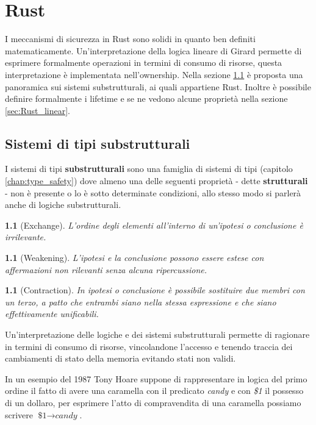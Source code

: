 \documentclass[Lau,binding=0.6cm]{sapthesis}
\newtheorem{lemma}[theorem]{}
\begin{document}
\chapter{Rust} \label{chap:Rust}

I meccanismi di sicurezza in Rust sono solidi in quanto ben definiti matematicamente.
Un'interpretazione della logica lineare di Girard permette di esprimere formalmente operazioni in termini di consumo di risorse, questa interpretazione è implementata nell'ownership.
Nella sezione \ref{sec:Rust_substruct} è proposta una panoramica sui sistemi substrutturali, ai quali appartiene Rust. 
Inoltre è possibile definire formalmente i lifetime e se ne vedono alcune proprietà nella sezione \ref{sec:Rust_linear}.

\section{Sistemi di tipi substrutturali} \label{sec:Rust_substruct}

I sistemi di tipi \textbf{substrutturali} sono una famiglia di sistemi di tipi (capitolo \ref{chap:type_safety}) dove almeno una delle seguenti proprietà - dette \textbf{strutturali} - non è presente o lo è sotto determinate condizioni, allo stesso modo si parlerà anche di logiche substrutturali.

\begin{lemma}[Exchange] \label{lemma:exchange}
    L'ordine degli elementi all'interno di un'ipotesi o conclusione è irrilevante.
\end{lemma}

\begin{lemma}[Weakening] \label{lemma:weakening}
    L'ipotesi e la conclusione possono essere estese con affermazioni non rilevanti senza alcuna ripercussione. 
\end{lemma}

\begin{lemma}[Contraction] \label{lemma:contraction}
    In ipotesi o conclusione è possibile sostituire due membri con un terzo, a patto che entrambi siano nella stessa espressione e che siano effettivamente unificabili.
\end{lemma}

Un'interpretazione delle logiche e dei sistemi substrutturali permette di ragionare in termini di consumo di risorse, vincolandone l'accesso e tenendo traccia dei cambiamenti di stato della memoria evitando stati non validi. 

In un esempio del 1987 Tony Hoare suppone di rappresentare in logica del primo ordine il fatto di avere una caramella con il predicato \textit{candy} e con  \textit{\$1} il possesso di un dollaro, per esprimere l'atto di compravendita di una caramella possiamo scrivere $ \textit{\$1} \rightarrow \textit{candy} $.
\end{document}
